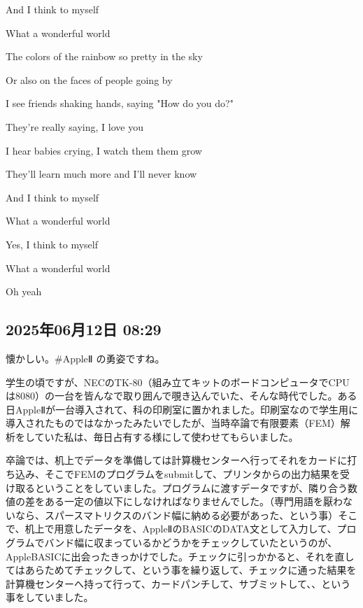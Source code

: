\documentclass[facebook_diary.tex]{subfiles}
\begin{document}
And I think to myself

What a wonderful world


The colors of the rainbow so pretty in the sky

Or also on the faces of people going by

I see friends shaking hands, saying "How do you do?"

They're really saying, I love you


I hear babies crying, I watch them them grow

They'll learn much more and I'll never know

And I think to myself

What a wonderful world

Yes, I think to myself

What a wonderful world


Oh yeah

\subsection*{2025年06月12日 08:29}

懐かしい。\#AppleⅡ の勇姿ですね。


学生の頃ですが、NECのTK-80（組み立てキットのボードコンピュータでCPUは8080）の一台を皆んなで取り囲んで覗き込んでいた、そんな時代でした。ある日AppleⅡが一台導入されて、科の印刷室に置かれました。印刷室なので学生用に導入されたものではなかったみたいでしたが、当時卒論で有限要素（FEM）解析をしていた私は、毎日占有する様にして使わせてもらいました。


卒論では、机上でデータを準備しては計算機センターへ行ってそれをカードに打ち込み、そこでFEMのプログラムをsubmitして、プリンタからの出力結果を受け取るということをしていました。プログラムに渡すデータですが、隣り合う数値の差をある一定の値以下にしなければなりませんでした。（専門用語を厭わないなら、スパースマトリクスのバンド幅に納める必要があった、という事）そこで、机上で用意したデータを、AppleⅡのBASICのDATA文として入力して、プログラムでバンド幅に収まっているかどうかをチェックしていたというのが、AppleBASICに出会ったきっかけでした。チェックに引っかかると、それを直してはあらためてチェックして、という事を繰り返して、チェックに通った結果を計算機センターへ持って行って、カードパンチして、サブミットして、、という事をしていました。
\end{document}
